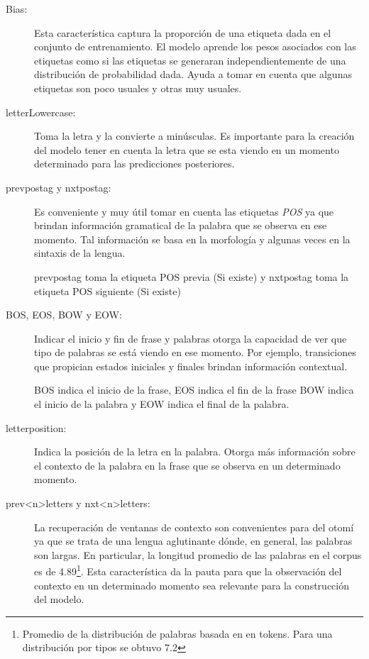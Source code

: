 \documentclass[letterpaper,12pt,oneside]{book}
\newcommand{\note}[4][]{\todo[author=#2,color=#3,size=\scriptsize,fancyline,caption={},#1]{#4}} %
\newcommand{\vic}[2][]{\note[#1]{Vic}{orange!40}{#2}}
\newcommand{\Vic}[2][]{\vic[inline,#1]{#2}\noindent}
\theoremstyle{definition}
\begin{document}
\Vic{Pasar a formato de description}
\begin{description}
    \item[Bias:] Esta característica captura la proporción de una etiqueta dada en el conjunto de entrenamiento. El modelo aprende los pesos asociados con las etiquetas como si las etiquetas se generaran independientemente de una distribución de probabilidad dada. Ayuda a tomar en cuenta que algunas etiquetas son poco usuales y otras muy usuales.
    
    \item[\textsf{letterLowercase}:] Toma la letra y la convierte a minúsculas. Es importante para la creación del modelo tener en cuenta la letra que se esta viendo en un momento determinado para las predicciones posteriores. 
    
    \item[\textsf{prevpostag} y \textsf{nxtpostag}:] Es conveniente y muy útil tomar en cuenta las etiquetas \textit{POS} ya que brindan información gramatical de la palabra que se observa en ese momento. Tal información se basa en la morfología y algunas veces en la sintaxis de la lengua.

    \textsf{prevpostag} toma la etiqueta POS previa (Si existe) y \textsf{nxtpostag} toma la etiqueta POS siguiente (Si existe)
    
    \item[\textsf{BOS}, \textsf{EOS}, \textsf{BOW} y \textsf{EOW}:] Indicar el inicio y fin de frase y palabras otorga la capacidad de ver que tipo de palabras se está viendo en ese momento. Por ejemplo, transiciones que propician estados iniciales y finales brindan información contextual.

    \textsf{BOS} indica el inicio de la frase, \textsf{EOS} indica el fin de la frase \textsf{BOW} indica el inicio de la palabra y \textsf{EOW} indica el final de la palabra.
    
    \item[\textsf{letterposition}:] Indica la posición de la letra en la palabra. Otorga más información sobre el contexto de la palabra en la frase que se observa en un determinado momento.
    
    \item[\textsf{prev<n>letters} y \textsf{nxt<n>letters}:] La recuperación de ventanas de contexto son convenientes para del otomí ya que se trata de una lengua aglutinante dónde, en general, las palabras son largas. En particular, la longitud promedio de las palabras en el corpus es de 4.89\footnote{Promedio de la distribución de palabras basada en  en tokens. Para una distribución por tipos se obtuvo 7.2}. Esta característica da la pauta para que la observación del contexto en un determinado momento sea relevante para la construcción del modelo.
    

\end{description}
\end{document}
